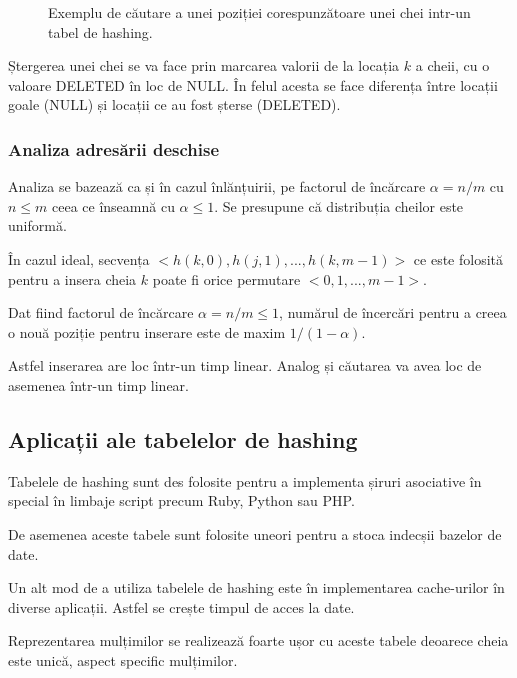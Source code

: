 \begin{figure}[H] 
	\centering	
	{
	}
	\caption{Exemplu de căutare a unei poziției corespunzătoare unei chei intr-un tabel de hashing.} 
	\label{fig:hashsearch}
\end{figure}

Ștergerea unei chei se va face prin marcarea valorii de la locația $k$ a cheii, cu o valoare DELETED în loc de NULL. În felul acesta se face diferența între locații goale (NULL) și locații ce au fost șterse (DELETED).

\subsubsection{Analiza adresării deschise}

Analiza se bazează ca și în cazul înlănțuirii, pe factorul de încărcare $\alpha = n/m$ cu $n \leq m$  ceea ce înseamnă cu $\alpha \leq 1$. Se presupune că distribuția cheilor este uniformă.

În cazul ideal, secvența $<h(k,0), h(j,1),..., h(k,m-1)>$ ce este folosită pentru a insera cheia $k$ poate fi orice permutare $<0,1,...,m-1>$.

Dat fiind factorul de încărcare $\alpha  = n/m \le 1$, numărul de încercări pentru a creea o nouă poziție pentru inserare este de maxim $1/(1-\alpha)$. 

Astfel inserarea are loc într-un timp linear.
Analog și căutarea va avea loc de asemenea într-un timp linear.


\subsection{Aplicații ale tabelelor de hashing}

Tabelele de hashing sunt des folosite pentru a implementa șiruri asociative în special în limbaje script precum Ruby, Python sau PHP.

De asemenea aceste tabele sunt folosite uneori pentru a stoca indecșii bazelor de date.

Un alt mod de a utiliza tabelele de hashing este în implementarea cache-urilor în diverse aplicații. Astfel se crește timpul de acces la date.

Reprezentarea mulțimilor se realizează foarte ușor cu aceste tabele deoarece cheia este unică, aspect specific mulțimilor.


